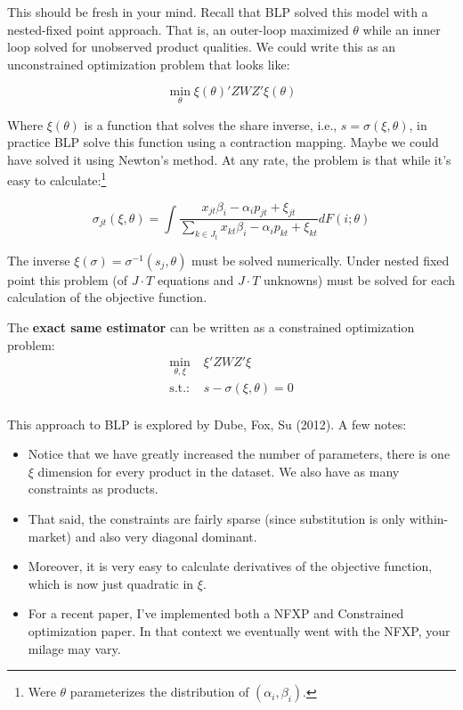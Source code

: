 \documentclass[twoside]{article}
\begin{document}
This should be fresh in your mind. Recall that BLP solved this model with a nested-fixed point approach. That is, an outer-loop maximized $\theta$ while an inner loop solved for unobserved product qualities. We could write this as an unconstrained optimization problem that looks like: 

$$ \min_\theta \xi(\theta)'Z W Z' \xi(\theta) $$

Where $\xi(\theta)$ is a function that solves the share inverse, i.e., $s = \sigma(\xi, \theta)$, in practice BLP solve this function using a contraction mapping.  Maybe we could have solved it using Newton's method. At any rate, the problem is that while it's easy to calculate:\footnote{Were $\theta$ parameterizes the distribution of $(\alpha_i, \beta_i)$.} 

$$\sigma_{jt}(\xi, \theta) = \int \frac{ x_{jt}\beta_i - \alpha_i p_{jt} + \xi_{jt}} {\sum_{k \in J_t} x_{kt}\beta_i - \alpha_i p_{kt} + \xi_{kt}} dF(i; \theta) $$  
 
The inverse $\xi(\sigma) = \sigma^{-1}(s_j, \theta)$ must be solved numerically. Under nested fixed point this problem (of $J\cdot T$ equations and $J\cdot T$ unknowns) must be solved for each calculation of the objective function.  

The {\bf exact same estimator} can be written as a constrained optimization problem: 
\begin{align*}
\min_{\theta, \xi}~ & \xi'Z W Z' \xi \\
\mbox{s.t.: } & s - \sigma(\xi, \theta) = 0 \\
\end{align*}

This approach to BLP is explored by Dube, Fox, Su (2012). A few notes: 
\begin{itemize}
\item Notice that we have greatly increased the number of parameters, there is one $\xi$ dimension for every product in the dataset. We also have as many constraints as products. 
\item That said, the constraints are fairly sparse (since substitution is only within-market) and also very diagonal dominant. 
\item Moreover, it is very easy to calculate derivatives of the objective function, which is now just quadratic in $\xi$. 
\item For a recent paper, I've implemented both a NFXP and Constrained optimization paper. In that context we eventually went with the NFXP, your milage may vary. 
\end{itemize}
\end{document}
